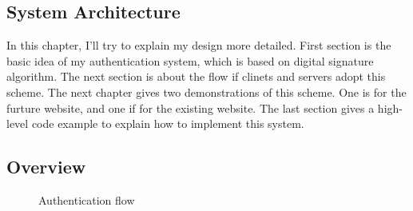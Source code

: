 \begin{CJK}{Bg5}{bsmi}


\chapter{System Architecture}

In this chapter, I'll try to explain my design more detailed. First section is the basic idea of my authentication system, which is based on digital signature algorithm. The next section is about the flow if clinets and servers adopt this scheme. The next chapter gives two demonstrations of this scheme. One is for the furture website, and one if for the existing website. The last section gives a high-level code example to explain how to implement this system.

\section{Overview}

\begin{figure}
\centering
{}
\caption{Authentication flow}
\end{figure}


\end{CJK}
